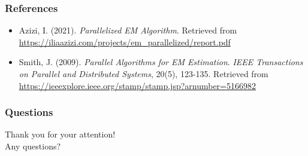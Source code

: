 \documentclass{beamer}
\begin{document}
\begin{frame}
    \frametitle{References}

    \begin{itemize}
        \item Azizi, I. (2021). \textit{Parallelized EM Algorithm}. Retrieved from \url{https://iliaazizi.com/projects/em_parallelized/report.pdf}
        \item Smith, J. (2009). \textit{Parallel Algorithms for EM Estimation}. \textit{IEEE Transactions on Parallel and Distributed Systems}, 20(5), 123-135. Retrieved from \url{https://ieeexplore.ieee.org/stamp/stamp.jsp?arnumber=5166982}
    \end{itemize}
    
    
    
    
\end{frame}

\begin{frame}
    \frametitle{Questions}
    \begin{center}
        Thank you for your attention!\\
        Any questions?
    \end{center}
\end{frame}
\end{document}

